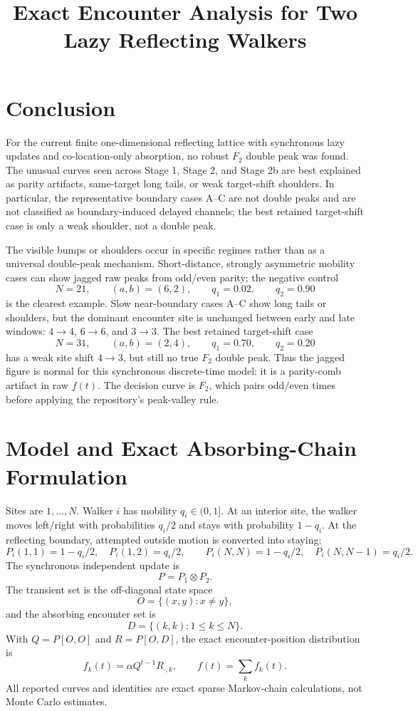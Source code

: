 \documentclass[10pt]{article}
\title{\vspace{-1.2cm}Exact Encounter Analysis for Two Lazy Reflecting Walkers}
\author{}
\date{}
\begin{document}
\maketitle
\vspace{-1.3cm}

\section*{Conclusion}
For the current finite one-dimensional reflecting lattice with synchronous lazy
updates and co-location-only absorption, no robust \(F_2\) double peak was
found.  The unusual curves seen across Stage 1, Stage 2, and Stage 2b are best
explained as parity artifacts, same-target long tails, or weak target-shift
shoulders.  In particular, the representative boundary cases A--C are not
double peaks and are not classified as boundary-induced delayed channels; the
best retained target-shift case is only a weak shoulder, not a double peak.

The visible bumps or shoulders occur in specific regimes rather than as a
universal double-peak mechanism.  Short-distance, strongly asymmetric mobility
cases can show jagged raw peaks from odd/even parity; the negative control
\[
N=21,\qquad (a,b)=(6,2),\qquad q_1=0.02,\qquad q_2=0.90
\]
is the clearest example.  Slow near-boundary cases A--C show long tails or
shoulders, but the dominant encounter site is unchanged between early and late
windows: \(4\to4\), \(6\to6\), and \(3\to3\).  The best retained target-shift
case
\[
N=31,\qquad (a,b)=(2,4),\qquad q_1=0.70,\qquad q_2=0.20
\]
has a weak site shift \(4\to3\), but still no true \(F_2\) double peak.
Thus the jagged figure is normal for this synchronous discrete-time model: it
is a parity-comb artifact in raw \(f(t)\).  The decision curve is \(F_2\), which
pairs odd/even times before applying the repository's peak-valley rule.

\section*{Model and Exact Absorbing-Chain Formulation}
Sites are \(1,\ldots,N\).  Walker \(i\) has mobility \(q_i\in(0,1]\).  At an
interior site, the walker moves left/right with probabilities \(q_i/2\) and
stays with probability \(1-q_i\).  At the reflecting boundary, attempted
outside motion is converted into staying:
\[
P_i(1,1)=1-q_i/2,\quad P_i(1,2)=q_i/2,\qquad
P_i(N,N)=1-q_i/2,\quad P_i(N,N-1)=q_i/2.
\]
The synchronous independent update is
\[
P=P_1\otimes P_2.
\]
The transient set is the off-diagonal state space
\[
O=\{(x,y):x\neq y\},
\]
and the absorbing encounter set is
\[
D=\{(k,k):1\leq k\leq N\}.
\]
With \(Q=P[O,O]\) and \(R=P[O,D]\), the exact encounter-position distribution is
\[
f_k(t)=\alpha Q^{t-1}R_{\cdot,k},\qquad f(t)=\sum_k f_k(t).
\]
All reported curves and identities are exact sparse Markov-chain calculations,
not Monte Carlo estimates.
\end{document}
